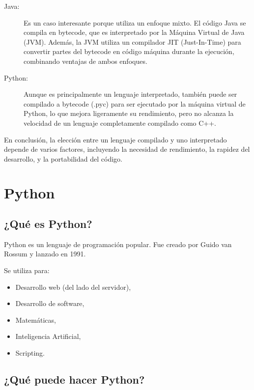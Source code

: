 \begin{description}
\item[Java:] Es un caso interesante porque utiliza un enfoque mixto. El
  código Java se compila en bytecode, que es interpretado por la Máquina
  Virtual de Java (JVM). Además, la JVM utiliza un compilador JIT
  (Just-In-Time) para convertir partes del bytecode en código máquina
  durante la ejecución, combinando ventajas de ambos enfoques.
\item[Python:] Aunque es principalmente un lenguaje interpretado, también
  puede ser compilado a bytecode (.pyc) para ser ejecutado por la
  máquina virtual de Python, lo que mejora ligeramente su rendimiento,
  pero no alcanza la velocidad de un lenguaje completamente compilado
  como C++.
\end{description}

En conclusión, la elección entre un lenguaje compilado y uno
interpretado depende de varios factores, incluyendo la necesidad de
rendimiento, la rapidez del desarrollo, y la portabilidad del código.

\section{Python}\label{python}

\subsection{¿Qué es Python?}\label{quuxe9-es-python}

Python es un lenguaje de programación popular. Fue creado por Guido van
Rossum y lanzado en 1991.

Se utiliza para:

\begin{itemize}
  \item Desarrollo web (del lado del servidor),
  \item Desarrollo de software,
  \item Matemáticas,
  \item Inteligencia Artificial,
  \item Scripting.
\end{itemize}

\subsection{¿Qué puede hacer Python?}\label{quuxe9-puede-hacer-python}

